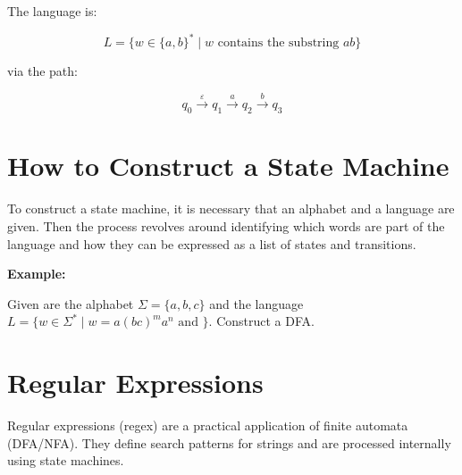 The language is:

\[
    L = \{ w \in \{a,b\}^* \mid w \text{ contains the substring } ab \}
\]

via the path:

\[
    q_0 \xrightarrow{\varepsilon} q_1 \xrightarrow{a} q_2 \xrightarrow{b} q_3
\]


\section{How to Construct a State Machine}

To construct a state machine, it is necessary that an alphabet and a language are given. Then 
the process revolves around identifying which words are part of the language and how they can be  
expressed as a list of states and transitions.

\textbf{Example:}

Given are the alphabet \(\Sigma = \{a,b,c\}\) and the language \(L = \{ w \in \Sigma^* \mid w = 
a(bc)^m a^n \text{ and }\}\). Construct a DFA. 

\begin{center}
\end{center}

\section{Regular Expressions}

Regular expressions (regex) are a practical application of finite automata (DFA/NFA). They define 
search patterns for strings and are processed internally using state machines.

